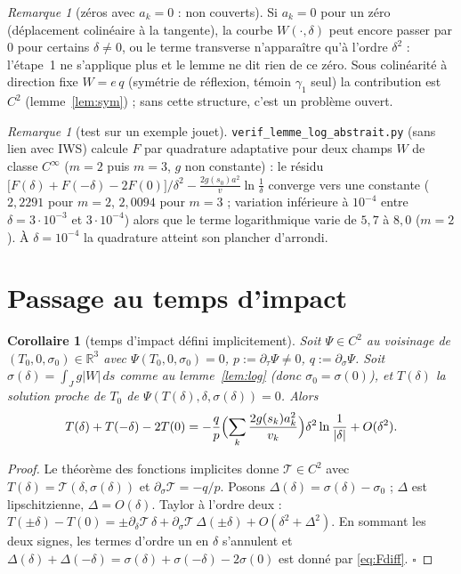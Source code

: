 \documentclass[11pt,a4paper]{article}
\newtheorem{corollaire}[theoreme]{Corollaire}
\theoremstyle{remark}
\newtheorem{remarque}[theoreme]{Remarque}
\newcommand{\R}{\mathbb R}
\newcommand{\dl}{\delta}
\begin{document}
\begin{remarque}[zéros avec $a_k=0$ : non couverts]\label{rem:ak0}
Si $a_k=0$ pour un zéro (déplacement colinéaire à la tangente), la courbe $W(\cdot,\dl)$ peut encore passer par $0$ pour certains $\dl\ne0$, ou le terme transverse n'apparaître qu'à l'ordre $\dl^2$ : l'étape~1 ne s'applique plus et le lemme ne dit rien de ce zéro. Sous colinéarité à direction fixe $W=e\,q$ (symétrie de réflexion, témoin $\gamma_1$ seul) la contribution est $C^2$ (lemme~\ref{lem:sym}) ; sans cette structure, c'est un problème ouvert.
\end{remarque}

\begin{remarque}[test sur un exemple jouet]
\texttt{verif\_lemme\_log\_abstrait.py} (sans lien avec IWS) calcule $F$ par quadrature adaptative pour deux champs $W$ de classe $C^\infty$ ($m=2$ puis $m=3$, $g$ non constante) : le résidu $\bigl[F(\dl)+F(-\dl)-2F(0)\bigr]/\dl^2-\frac{2g(s_0)a^2}v\ln\frac1\dl$ converge vers une constante ($2{,}2291$ pour $m=2$, $2{,}0094$ pour $m=3$ ; variation inférieure à $10^{-4}$ entre $\dl=3\cdot10^{-3}$ et $3\cdot10^{-4}$) alors que le terme logarithmique varie de $5{,}7$ à $8{,}0$ ($m=2$). À $\dl=10^{-4}$ la quadrature atteint son plancher d'arrondi.
\end{remarque}

\section{Passage au temps d'impact}

\begin{corollaire}[temps d'impact défini implicitement]\label{cor:T}
Soit $\Psi\in C^2$ au voisinage de $(T_0,0,\sigma_0)\in\R^3$ avec $\Psi(T_0,0,\sigma_0)=0$, $p:=\partial_\tau\Psi\neq0$, $q:=\partial_\sigma\Psi$. Soit $\sigma(\dl)=\int_{J}g\lvert W\rvert\,ds$ comme au lemme~\ref{lem:log} (donc $\sigma_0=\sigma(0)$), et $T(\dl)$ la solution proche de $T_0$ de $\Psi(T(\dl),\dl,\sigma(\dl))=0$. Alors
\[
T(\dl)+T(-\dl)-2T(0)=-\frac qp\Bigl(\sum_k\frac{2g(s_k)a_k^2}{v_k}\Bigr)\dl^2\ln\frac1{\lvert\dl\rvert}+O(\dl^2).
\]
\end{corollaire}
\begin{proof}
Le théorème des fonctions implicites donne $\mathcal T\in C^2$ avec $T(\dl)=\mathcal T(\dl,\sigma(\dl))$ et $\partial_\sigma\mathcal T=-q/p$. Posons $\Delta(\dl)=\sigma(\dl)-\sigma_0$ ; $\Delta$ est lipschitzienne, $\Delta=O(\dl)$. Taylor à l'ordre deux : $T(\pm\dl)-T(0)=\pm\partial_\dl\mathcal T\,\dl+\partial_\sigma\mathcal T\,\Delta(\pm\dl)+O(\dl^2+\Delta^2)$. En sommant les deux signes, les termes d'ordre un en $\dl$ s'annulent et $\Delta(\dl)+\Delta(-\dl)=\sigma(\dl)+\sigma(-\dl)-2\sigma(0)$ est donné par \eqref{eq:Fdiff}. $\square$
\end{proof}
\end{document}
